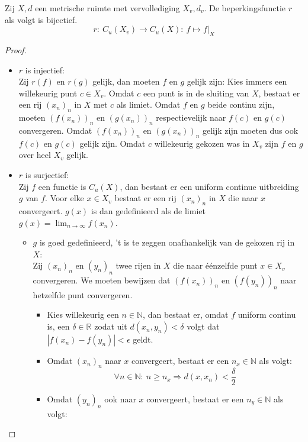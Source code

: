 \documentclass[main.tex]{subfiles}
\begin{document}
\begin{st}
  Zij $X,d$ een metrische ruimte met vervollediging $X_{v},d_{v}$.
  De beperkingsfunctie $r$ als volgt is bijectief.
  \[ r:\ C_{u}(X_{v}) \rightarrow C_{u}(X):\ f \mapsto f|_{X}\]
  
  \begin{proof}
    \noindent
    \begin{itemize}
    \item $r$ is injectief:\\
      Zij $r(f)$ en $r(g)$ gelijk, dan moeten $f$ en $g$ gelijk zijn:
      Kies immers een willekeurig punt $c\in X_{v}$. 
      Omdat $c$ een punt is in de sluiting van $X$, bestaat er een rij $(x_{n})_{n}$ in $X$ met $c$ als limiet.
      Omdat $f$ en $g$ beide continu zijn, moeten $(f(x_{n}))_{n}$ en $(g(x_{n}))_{n}$ respectievelijk naar $f(c)$ en $g(c)$ convergeren.
      Omdat $(f(x_{n}))_{n}$ en $(g(x_{n}))_{n}$ gelijk zijn moeten dus ook $f(c)$ en $g(c)$ gelijk zijn.
      Omdat $c$ willekeurig gekozen was in $X_{v}$ zijn $f$ en $g$ over heel $X_{v}$ gelijk.
    \item $r$ is surjectief:\\
      Zij $f$ een functie is $C_{u}(X)$, dan bestaat er een uniform continue uitbreiding $g$ van $f$.
      Voor elke $x\in X_{v}$ bestaat er een rij $(x_{n})_{n}$ in $X$ die naar $x$ convergeert.
      $g(x)$ is dan gedefinieerd als de limiet $g(x) = \lim_{n\rightarrow \infty}f(x_{n})$.
      \begin{itemize}
      \item $g$ is goed gedefinieerd, 't is te zeggen onafhankelijk van de gekozen rij in $X$:\\
        Zij $(x_{n})_{n}$ en $(y_{n})_{n}$ twee rijen in $X$ die naar \'e\'enzelfde punt $x\in X_{v}$ convergeren.
        We moeten bewijzen dat $(f(x_{n}))_{n}$ en $(f(y_{n}))_{n}$ naar hetzelfde punt convergeren.
        \begin{itemize}
        \item 
          Kies willekeurig een $n\in\mathbb{N}$, dan bestaat er, omdat $f$ uniform continu is, een $\delta\in\mathbb{R}$ zodat uit $d(x_{n},y_{n})< \delta$ volgt dat $|f(x_{n})-f(y_{n})|<\epsilon$ geldt.
        \item 
          Omdat $(x_{n})_{n}$ naar $x$ convergeert, bestaat er een $n_{x}\in\mathbb{N}$ als volgt:
          \[ \forall n\in\mathbb{N}:\ n \ge n_{x} \Rightarrow d(x,x_{n}) < \frac{\delta}{2} \]
        \item 
          Omdat $(y_{n})_{n}$ ook naar $x$ convergeert, bestaat er een $n_{y}\in\mathbb{N}$ als volgt:

\end{itemize}
\end{itemize}
\end{itemize}
\end{proof}
\end{st}
\end{document}
